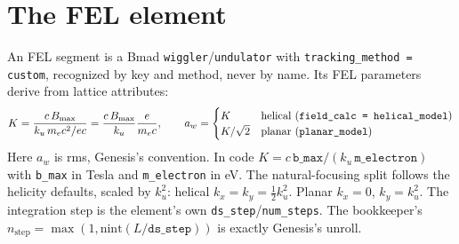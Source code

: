 \documentclass[11pt]{article}
\newcommand{\code}[1]{\texttt{#1}}
\begin{document}
\section{The FEL element}\label{sec:element}

An FEL segment is a Bmad \code{wiggler}/\code{undulator} with
\code{tracking\_method = custom}, recognized by key and method, never by name. Its FEL
parameters derive from lattice attributes:
\begin{equation}\label{eq:awmap}
  K = \frac{c\,B_{\max}}{k_u\, m_e c^2/e c} = \frac{c\,B_{\max}}{k_u}\frac{e}{m_e c},
  \qquad
  a_w = \begin{cases} K & \text{helical (\code{field\_calc = helical\_model})}\\
                      K/\sqrt2 & \text{planar (\code{planar\_model})}\end{cases}
\end{equation}
Here $a_w$ is rms, Genesis's convention. In code $K = c\,\code{b\_max}/(k_u\,
\code{m\_electron})$ with \code{b\_max} in Tesla and \code{m\_electron} in eV. The
natural-focusing split follows the helicity defaults, scaled by $k_u^2$:
helical $k_x = k_y = \tfrac12 k_u^2$. Planar $k_x = 0$, $k_y = k_u^2$. The integration
step is the element's own \code{ds\_step}/\code{num\_steps}. The bookkeeper's
$n_{\mathrm{step}} = \max(1, \mathrm{nint}(L/\code{ds\_step}))$ is exactly Genesis's
unroll.
\end{document}
